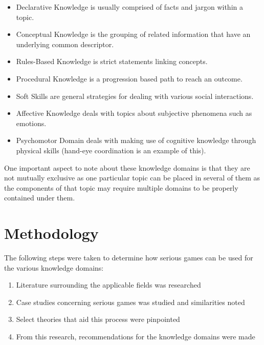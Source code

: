 \documentclass[conference]{IEEEtran}
\begin{document}
\begin{itemize}
\item Declarative Knowledge is usually comprised of facts and jargon within a topic.\\
\item Conceptual Knowledge is the grouping of related information that have an underlying common descriptor.\\
\item Rules-Based Knowledge is strict statements linking concepts.\\
\item Procedural Knowledge is a progression based path to reach an outcome.\\
\item Soft Skills are general strategies for dealing with various social interactions.\\
\item Affective Knowledge deals with topics about subjective phenomena such as emotions.\\
\item Psychomotor Domain deals with making use of cognitive knowledge through physical skills (hand-eye coordination is an example of this).
\end{itemize}

One important aspect to note about these knowledge domains is that they are not mutually exclusive as one particular topic can be placed in several of them as the components of that topic may require multiple domains to be properly contained under them. 


\section{Methodology}
The following steps were taken to determine how serious games can be used for the various knowledge domains:

\begin{enumerate}
\item Literature surrounding the applicable fields was researched
\item Case studies concerning serious games was studied and similarities noted
\item Select theories that aid this process were pinpointed
\item From this research, recommendations for the knowledge domains were made
\end{enumerate}
\end{document}
